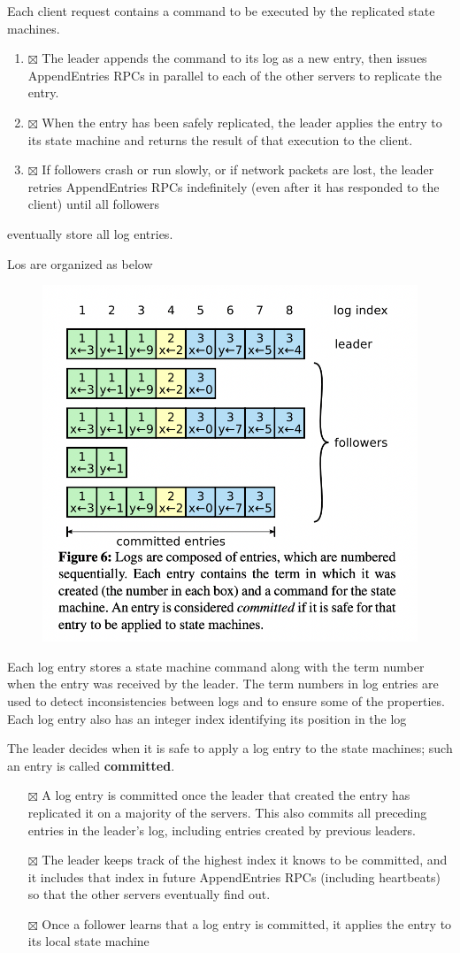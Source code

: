 \documentclass[11pt]{article}
\begin{document}
Each client request contains a command to be executed by the replicated state machines.
\begin{enumerate}
\item{$\boxtimes$} The leader appends the command to its log as a new entry, then issues AppendEntries RPCs in
parallel to each of the other servers to replicate the entry.
\item{$\boxtimes$} When the entry has been safely replicated, the leader applies the entry to its state machine
and returns the result of that execution to the client.
\item{$\boxtimes$} If followers crash or run slowly, or if network packets are lost, the leader retries
AppendEntries RPCs indefinitely (even after it has responded to the client) until all
followers
\end{enumerate}
eventually store all log entries.

Los are organized as below
\begin{figure}[htbp]
\centering
\includegraphics[width=.7\textwidth]{../images/6.824/6.png}
\label{}
\end{figure}
Each log entry stores a state machine command along with the term number when the entry was
received by the leader. The term numbers in log entries are used to detect inconsistencies
between logs and to ensure some of the properties. Each log entry also has an integer index
identifying its position in the log

The leader decides when it is safe to apply a log entry to the state machines; such an entry is
called \textbf{committed}.
\begin{itemize}
\item[{$\boxtimes$}] A log entry is committed once the leader that created the entry has replicated it on a
majority of the servers. This also commits all preceding entries in the leader's log,
including entries created by previous leaders.
\item[{$\boxtimes$}] The leader keeps track of the highest index it knows to be committed, and it includes that
index in future AppendEntries RPCs (including heartbeats) so that the other servers eventually
find out.
\item[{$\boxtimes$}] Once a follower learns that a log entry is committed, it applies the entry to its local state machine
\end{itemize}
\end{document}
